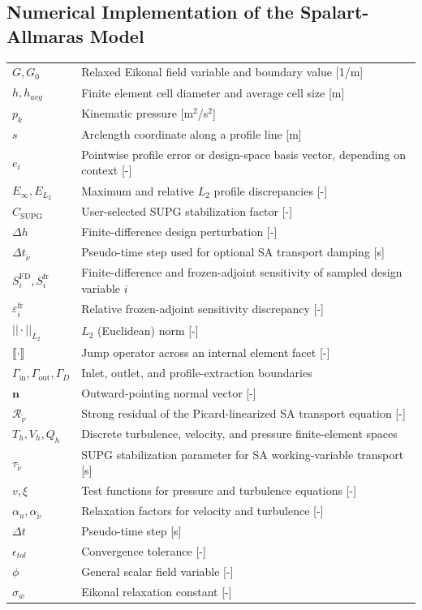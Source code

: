\documentclass[master=ewtk,masteroption=,openany]{kulemt}
\begin{document}
\subsection*{Numerical Implementation of the Spalart-Allmaras Model}
\begin{flushleft}
	\renewcommand{\arraystretch}{1.1}
	\begin{tabularx}{\textwidth}{@{}p{35mm}X@{}}
		$G, G_0$ & Relaxed Eikonal field variable and boundary value [1/m] \\
			$h, h_{avg}$ & Finite element cell diameter and average cell size [m] \\
			$p_k$ & Kinematic pressure [m$^2$/s$^2$] \\
			$s$ & Arclength coordinate along a profile line [m] \\
			$e_i$ & Pointwise profile error or design-space basis vector, depending on context [-] \\
			$E_\infty, E_{L_2}$ & Maximum and relative $L_2$ profile discrepancies [-] \\
			$C_{\mathrm{SUPG}}$ & User-selected SUPG stabilization factor [-] \\
			$\Delta h$ & Finite-difference design perturbation [-] \\
			$\Delta t_{\tilde{\nu}}$ & Pseudo-time step used for optional SA transport damping [s] \\
			$S_i^{\mathrm{FD}}, S_i^{\mathrm{fr}}$ & Finite-difference and frozen-adjoint sensitivity of sampled design variable $i$ \\
			$\varepsilon_i^{\mathrm{fr}}$ & Relative frozen-adjoint sensitivity discrepancy [-] \\
			$||\cdot||_{L_2}$ & $L_2$ (Euclidean) norm [-] \\
			$\llbracket \cdot \rrbracket$ & Jump operator across an internal element facet [-] \\
			$\Gamma_{\mathrm{in}}, \Gamma_{\mathrm{out}}, \Gamma_D$ & Inlet, outlet, and profile-extraction boundaries \\
			$\mathbf{n}$ & Outward-pointing normal vector [-] \\
			$\mathcal{R}_{\tilde{\nu}}$ & Strong residual of the Picard-linearized SA transport equation [-] \\
			$T_h, V_h, Q_h$ & Discrete turbulence, velocity, and pressure finite-element spaces \\
			$\tau_{\tilde{\nu}}$ & SUPG stabilization parameter for SA working-variable transport [s] \\
			$v, \xi$ & Test functions for pressure and turbulence equations [-] \\
			$\alpha_u, \alpha_{\tilde{\nu}}$ & Relaxation factors for velocity and turbulence [-] \\
			$\Delta t$ & Pseudo-time step [s] \\
		$\epsilon_{tol}$ & Convergence tolerance [-] \\
		$\phi$ & General scalar field variable [-] \\
		$\sigma_w$ & Eikonal relaxation constant [-] \\
	\end{tabularx}
\end{flushleft}
\end{document}
